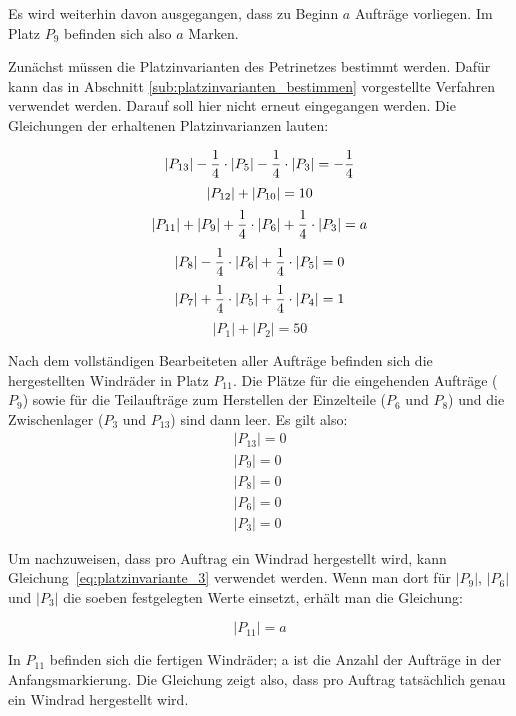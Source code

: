 Es wird weiterhin davon ausgegangen, dass zu Beginn $a$ Aufträge vorliegen. Im Platz $P_9$ befinden sich also $a$ Marken.

Zunächst müssen die Platzinvarianten des Petrinetzes bestimmt werden. Dafür kann das in Abschnitt \ref{sub:platzinvarianten_bestimmen} vorgestellte Verfahren verwendet werden. Darauf soll hier nicht erneut eingegangen werden. Die Gleichungen der erhaltenen Platzinvarianzen lauten:

\begin{equation}
	|P_{13}| - \frac{1}{4}\cdot|P_5| - \frac{1}{4}\cdot|P_3| = -\frac{1}{4} \\
\end{equation}
\begin{equation}
	|P_{12}| + |P_{10}| = 10 \\
\end{equation}
\begin{equation}
	|P_{11}| + |P_9| + \frac{1}{4}\cdot|P_6| + \frac{1}{4}\cdot|P_3| = a	\\
	\label{eq:platzinvariante_3}
\end{equation}
\begin{equation}
	|P_8| - \frac{1}{4}\cdot|P_6| + \frac{1}{4}\cdot|P_5| = 0 \\
\end{equation}
\begin{equation}
	|P_7| + \frac{1}{4}\cdot|P_5| + \frac{1}{4}\cdot|P_4| = 1 \\
\end{equation}
\begin{equation}
	|P_1| + |P_2| = 50
\end{equation}

Nach dem vollständigen Bearbeiteten aller Aufträge befinden sich die hergestellten Windräder in Platz $P_{11}$. Die Plätze für die eingehenden Aufträge ($P_9$) sowie für die Teilaufträge zum Herstellen der Einzelteile ($P_6$ und $P_8$) und die Zwischenlager ($P_3$ und $P_{13}$) sind dann leer. Es gilt also:
$$
\begin{matrix}
|P_{13}| = 0 \\
|P_9| = 0 \\
|P_8| = 0 \\
|P_6| = 0 \\
|P_3| = 0	
\end{matrix}
$$

Um nachzuweisen, dass pro Auftrag ein Windrad hergestellt wird, kann Gleichung~\ref{eq:platzinvariante_3} verwendet werden. Wenn man dort für $|P_9|$, $|P_6|$ und $|P_3|$ die soeben festgelegten Werte einsetzt, erhält man die Gleichung:

$$
|P_{11}| = a
$$

In $P_{11}$ befinden sich die fertigen Windräder; a ist die Anzahl der Aufträge in der Anfangsmarkierung. Die Gleichung zeigt also, dass pro Auftrag tatsächlich genau ein Windrad hergestellt wird.
